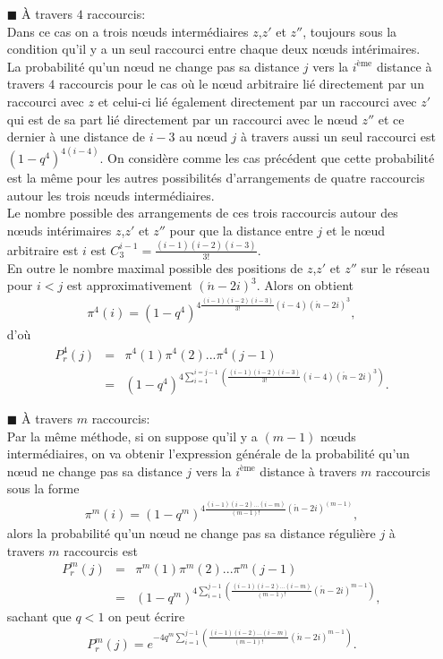 \begin{itemize}
\item[$\blacksquare$] \`{A} travers $4$ raccourcis:\\
Dans ce cas on a trois nœuds intermédiaires $z$,$z'$ et $z''$, toujours sous la condition  qu'il y a un seul raccourci entre chaque deux nœuds
intérimaires. La probabilité qu'un nœud ne change pas sa distance $j$ vers la $i^{\text{ème}}$ distance à travers $4$ raccourcis pour 
le cas où le nœud arbitraire lié directement par un raccourci avec $z$ et celui-ci lié également directement par un raccourci 
avec $z'$ qui est de sa part lié directement par un raccourci avec le nœud $z''$  et ce dernier à une distance de $i-3$ au
nœud $j$ à travers aussi un seul raccourci est $(1-q^4)^{4(i-4)}$.
On considère comme les cas précédent que cette probabilité est la m\^{e}me
pour les autres possibilités d'arrangements de quatre raccourcis autour les trois nœuds intermédiaires.\\ Le nombre possible des arrangements de ces trois raccourcis
autour des nœuds intérimaires $z$,$z'$ et $z''$ pour que la distance entre $j$ et le nœud  arbitraire est $i$ est
$C_3^{i-1}=\frac{(i-1)(i-2)(i-3)}{3!}$.\\ En outre le nombre maximal possible  des positions de $z$,$z'$ et $z''$ sur le réseau pour $i<j$ est  approximativement
$(\acute{n}-2i)^3$.
Alors on obtient
\begin{eqnarray}
	\pi^4(i)=(1-q^4)^{4\frac{(i-1)(i-2)(i-3)}{3!}(i-4)(\acute{n}-2i)^3},\nonumber
	\end{eqnarray}
	d'où
	\begin{eqnarray}
	P_r^4(j)&=&\pi^4(1)\pi^4(2)...\pi^4(j-1)\\\nonumber
	&=& (1-q^4)^{4\sum_{i=1}^{i=j-1}(\frac{(i-1)(i-2)(i-3)}{3!}(i-4)(\acute{n}-2i)^3)}.
	\end{eqnarray}
	
\item[$\blacksquare$] \`{A} travers $m$ raccourcis:\\
Par la m\^{e}me méthode, si on suppose qu'il  y a $(m-1)$ nœuds intermédiaires, on va obtenir l'expression générale de la probabilité qu'un nœud ne change pas sa distance $j$ vers la $i^{\text{ème}}$ distance à travers $m$ raccourcis sous la forme 
\begin{eqnarray}
	\pi^m(i)=(1-q^m)^{4\frac{(i-1)(i-2)\ldots(i-m)}{(m-1)!}(\acute{n}-2i)^{(m-1)}},\nonumber
\end{eqnarray}
alors la probabilité qu'un nœud ne change pas sa distance régulière $j$ à travers $m$ raccourcis est
\begin{eqnarray}
	P_r^m(j)&=&\pi^m(1)\pi^m(2)...\pi^m(j-1)\\\nonumber
	&=& (1-q^m)^{4\sum_{i=1}^{j-1}(\frac{(i-1)(i-2)\ldots(i-m)}{(m-1)!}(\acute{n}-2i)^{m-1})},
	\end{eqnarray}
sachant que $q<1$ on peut écrire 
\begin{eqnarray}
P_r^m(j)=e^{-4q^m\sum_{i=1}^{j-1}(\frac{(i-1)(i-2)\ldots(i-m)}{(m-1)!}(\acute{n}-2i)^{m-1})}.
\end{eqnarray}
\end{itemize}

